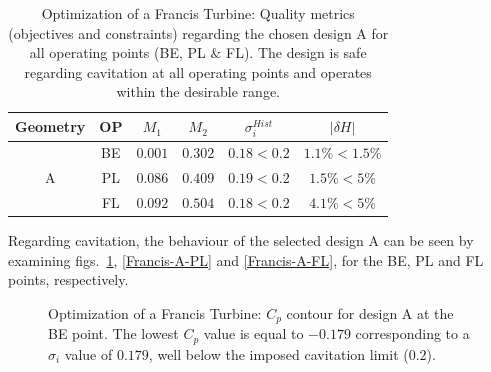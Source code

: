 \begin{table}[h!]
\begin{center}
\begin{tabular}{ |c|c|c|c|c|c| }
\hline
Geometry & OP & $M_1$ & $M_2$  & $\sigma_i^{Hist}$ & $|\delta H|$\\
\hline
& BE & $0.001$ & $0.302$ & $0.18 < 0.2$ & $ 1.1\% <1.5\%$ \\
A & PL & $0.086$ & $0.409$ & $0.19 < 0.2$ & $ 1.5\% <5\%$ \\
& FL & $0.092$ & $0.504$ & $0.18 < 0.2$ & $ 4.1\% <5\%$  \\
\hline
\end{tabular}
\caption{Optimization of a Francis Turbine: Quality metrics (objectives and constraints) regarding the chosen design A for all operating points (BE, PL $\&$ FL). The design is safe regarding cavitation at all operating points and operates within the desirable range.}
\label{Asum}
\end{center}
\end{table} 

Regarding cavitation, the behaviour of the selected design A can be seen by examining figs.\          \ref{Francis-A-BE}, \ref{Francis-A-PL} and \ref{Francis-A-FL}, for the BE, PL and FL points, respectively.      


\begin{figure}[h!]
\begin{minipage}[b]{1\linewidth}
 \centering
\end{minipage}
\caption{Optimization of a Francis Turbine: $C_p$ contour for design A at the BE point. The lowest $C_p$ value is equal to $-0.179$ corresponding to a $\sigma_i$ value of $0.179$, well below the imposed cavitation limit ($0.2$).}
\label{Francis-A-BE}
\end{figure}

